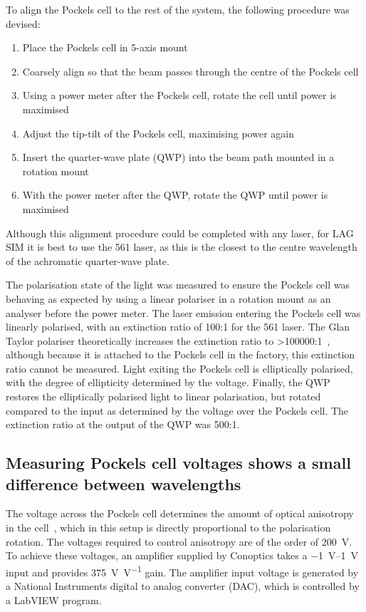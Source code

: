 To align the Pockels cell to the rest of the system, the following procedure was devised: %
\begin{enumerate}
	\item Place the Pockels cell in 5-axis mount
	\item Coarsely align so that the beam passes through the centre of the Pockels cell
	\item Using a power meter after the Pockels cell, rotate the cell until power is maximised
	\item Adjust the tip-tilt of the Pockels cell, maximising power again
	\item Insert the quarter-wave plate (QWP) into the beam path mounted in a rotation mount 
	\item With the power meter after the QWP, rotate the QWP until power is maximised
\end{enumerate}

Although this alignment procedure could be completed with any laser, for LAG SIM it is best to use the 561 laser, as this is the closest to the centre wavelength of the achromatic quarter-wave plate. 

The polarisation state of the light was measured to ensure the Pockels cell was behaving as expected by using a linear polariser in a rotation mount as an analyser before the power meter. 
The laser emission entering the Pockels cell was linearly polarised, with an extinction ratio of 100:1 for the 561 laser. 
The Glan Taylor polariser theoretically increases the extinction ratio to >\num{100000}:1~\cite{bennett1995handbook}, although because it is attached to the Pockels cell in the factory, this extinction ratio cannot be measured. 
Light exiting the Pockels cell is elliptically polarised, with the degree of ellipticity determined by the voltage. 
Finally, the QWP restores the elliptically polarised light to linear polarisation, but rotated compared to the input as determined by the voltage over the Pockels cell.
The extinction ratio at the output of the QWP was 500:1. 

\subsection{Measuring Pockels cell voltages shows a small difference between wavelengths}
The voltage across the Pockels cell determines the amount of optical anisotropy in the cell~\cite[\textit{ch. 8}]{hecht2017optics}, which in this setup is directly proportional to the polarisation rotation. 
The voltages required to control anisotropy are of the order of \SI{200}{\volt}. 
To achieve these voltages, an amplifier supplied by Conoptics takes a \SIrange{-1}{1}{\volt} input and provides \SI[per-mode=symbol]{375}{\volt\per\volt} gain. 
The amplifier input voltage is generated by a National Instruments digital to analog converter (DAC), which is controlled by a LabVIEW program. 

